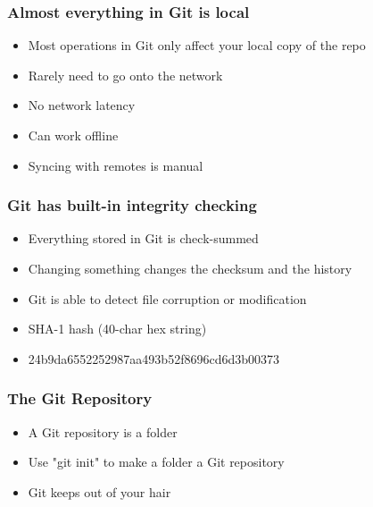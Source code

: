 \documentclass{beamer}
\begin{document}
\begin{frame}
	\frametitle{Almost everything in Git is local}
	\begin{itemize}
		\item{Most operations in Git only affect your local copy of the repo}
		\item{Rarely need to go onto the network}
		\item{No network latency}
		\item{Can work offline}
		\item{Syncing with remotes is manual}
	\end{itemize}

\end{frame}

\begin{frame}
	\frametitle{Git has built-in integrity checking}
	\begin{itemize}
		\item{Everything stored in Git is check-summed}
		\item{Changing something changes the checksum and the history}
		\item{Git is able to detect file corruption or modification}
		\item{SHA-1 hash (40-char hex string)}
		\item{24b9da6552252987aa493b52f8696cd6d3b00373}
	\end{itemize}

\end{frame}


\begin{frame}
	\frametitle{The Git Repository}
	\begin{itemize}
		\item{A Git repository is a folder}
		\item{Use "git init" to make a folder a Git repository}
		\item{Git keeps out of your hair}
	\end{itemize}
\end{frame}
\end{document}
